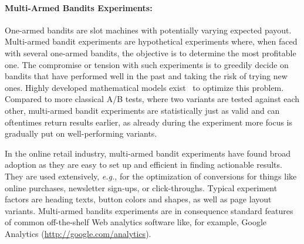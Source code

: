 \paragraph{Multi-Armed Bandits Experiments:}

One-armed bandits are slot machines
with potentially varying expected payout.
Multi-armed bandit experiments are hypothetical experiments
where, when faced with several one-armed bandits,
the objective is to determine the most profitable one.
The compromise or tension with such experiments is to
greedily decide on bandits that have performed well in the past
and taking the risk of trying new ones.
Highly developed mathematical models exist~\cite{scott2010bandits}
to optimize this problem.
Compared to more classical A/B tests, where two variants
are tested against each other, multi-armed bandit experiments
are statistically just as valid and can oftentimes return results earlier, as already during the experiment
more focus is gradually put on well-performing variants.

In the online retail industry, multi-armed bandit experiments
have found broad adoption as they are easy to set up and efficient in finding actionable results.
They are used extensively, \emph{e.g.}, for the optimization
of conversions for things like
online purchases, newsletter sign-ups, or click-throughs.
Typical experiment factors are heading texts, button colors and shapes,
as well as page layout variants.
Multi-armed bandits experiments are in consequence standard features
of common off-the-shelf Web analytics software like, for example,
Google Analytics (\url{http://google.com/analytics}).

